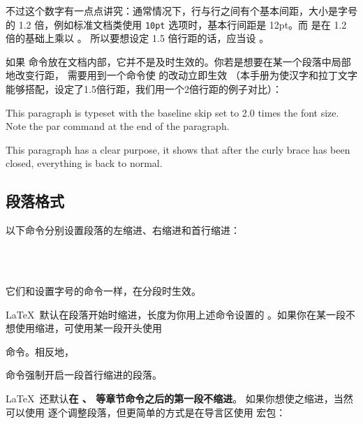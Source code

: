 不过这个数字有一点点讲究：通常情况下，行与行之间有个基本间距，大小是字号的 1.2 倍，例如标准文档类使用
\texttt{10pt} 选项时，基本行间距是 12pt。而  是在 1.2 倍的基础上乘以 。
所以要想设定 1.5 倍行距的话，应当设  。

如果  命令放在文档内部，它并不是及时生效的。你若是想要在某一个段落中局部地改变行距，
需要用到一个命令使  的改动立即生效
（本手册为使汉字和拉丁文字能够搭配，设定了1.5倍行距，我们用一个2倍行距的例子对比）：
\begin{command}
\end{command}

\begin{example}
{\linespread{1.67}\selectfont
This paragraph is typeset with
the baseline skip set to 2.0 times
the font size. Note the par
command at the end of the
paragraph.\par}

This paragraph has a clear
purpose, it shows that after the
curly brace has been closed,
everything is back to normal.
\end{example}

\subsection{段落格式}

以下命令分别设置段落的左缩进、右缩进和首行缩进：
\begin{command}
\marg*{20pt}  \\
\marg*{20pt} \\
\marg*{2em}
\end{command}

它们和设置字号的命令一样，在分段时生效。

\LaTeX\ 默认在段落开始时缩进，长度为你用上述命令设置的 。如果你在某一段不想使用缩进，可使用某一段开头使用
\begin{command}
\end{command}
命令。相反地，
\begin{command}
\end{command}
命令强制开启一段首行缩进的段落。

\LaTeX\ 还默认\textbf{在 、 等章节命令之后的第一段不缩进}。
如果你想使之缩进，当然可以使用  逐个调整段落，但更简单的方式是在导言区使用  宏包：
\begin{command}
\end{command}

